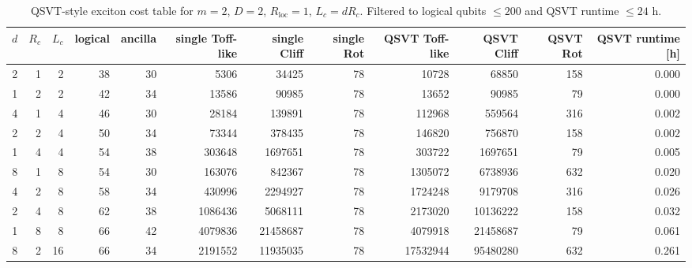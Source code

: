\begin{table}[t]
\centering
\scriptsize
\caption{QSVT-style exciton cost table for $m=2$, $D=2$, $R_{\mathrm{loc}}=1$, $L_c=dR_c$. Filtered to logical qubits $\leq 200$ and QSVT runtime $\leq 24$ h.}
\begin{tabularx}{\linewidth}{rrrrrrrrrrrr}
\toprule
$d$ & $R_c$ & $L_c$ & logical & ancilla & single Toff-like & single Cliff & single Rot & QSVT Toff-like & QSVT Cliff & QSVT Rot & QSVT runtime [h] \\
\midrule
2 & 1 & 2 & 38 & 30 & 5306 & 34425 & 78 & 10728 & 68850 & 158 & 0.000 \\
1 & 2 & 2 & 42 & 34 & 13586 & 90985 & 78 & 13652 & 90985 & 79 & 0.000 \\
4 & 1 & 4 & 46 & 30 & 28184 & 139891 & 78 & 112968 & 559564 & 316 & 0.002 \\
2 & 2 & 4 & 50 & 34 & 73344 & 378435 & 78 & 146820 & 756870 & 158 & 0.002 \\
1 & 4 & 4 & 54 & 38 & 303648 & 1697651 & 78 & 303722 & 1697651 & 79 & 0.005 \\
8 & 1 & 8 & 54 & 30 & 163076 & 842367 & 78 & 1305072 & 6738936 & 632 & 0.020 \\
4 & 2 & 8 & 58 & 34 & 430996 & 2294927 & 78 & 1724248 & 9179708 & 316 & 0.026 \\
2 & 4 & 8 & 62 & 38 & 1086436 & 5068111 & 78 & 2173020 & 10136222 & 158 & 0.032 \\
1 & 8 & 8 & 66 & 42 & 4079836 & 21458687 & 78 & 4079918 & 21458687 & 79 & 0.061 \\
8 & 2 & 16 & 66 & 34 & 2191552 & 11935035 & 78 & 17532944 & 95480280 & 632 & 0.261 \\
\bottomrule
\end{tabularx}
\end{table}
